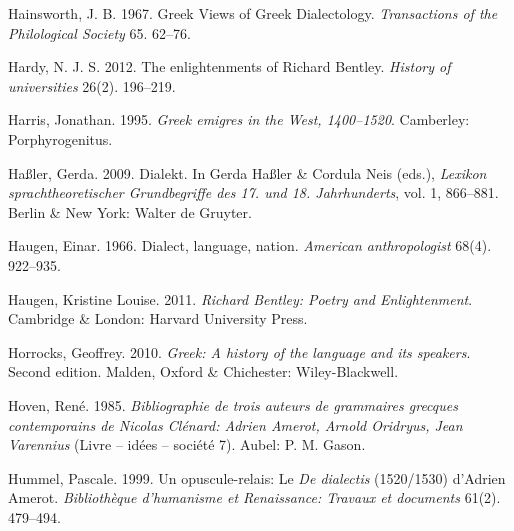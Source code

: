\begin{styleStandard}
Hainsworth, J. B. 1967. Greek Views of Greek Dialectology. \textit{Transactions of the Philological Society} 65. 62–76.
\end{styleStandard}

\begin{styleStandard}
Hardy, N. J. S. 2012. The enlightenments of Richard Bentley. \textit{History of universities} 26(2). 196–219.
\end{styleStandard}

\begin{styleStandard}
Harris, Jonathan. 1995. \textit{Greek emigres in the West, 1400–1520}. Camberley: Porphyrogenitus.
\end{styleStandard}

\begin{styleStandard}
Haßler, Gerda. 2009. Dialekt. In Gerda Haßler \& Cordula Neis (eds.), \textit{Lexikon sprachtheoretischer Grundbegriffe des 17. und 18. Jahrhunderts}, vol. 1, 866–881. Berlin \& New York: Walter de Gruyter.
\end{styleStandard}

\begin{styleStandard}
Haugen, Einar. 1966. Dialect, language, nation. \textit{American anthropologist} 68(4). 922–935.
\end{styleStandard}

\begin{styleStandard}
Haugen, Kristine Louise. 2011. \textit{Richard Bentley: Poetry and Enlightenment}. Cambridge \& London: Harvard University Press.
\end{styleStandard}

\begin{styleStandard}
Horrocks, Geoffrey. 2010. \textit{Greek: A history of the language and its speakers}. Second edition. Malden, Oxford \& Chichester: Wiley-Blackwell.
\end{styleStandard}

\begin{styleStandard}
Hoven, René. 1985. \textit{Bibliographie de trois auteurs de grammaires grecques contemporains de Nicolas Clénard: Adrien Amerot, Arnold Oridryus, Jean Varennius} (Livre – idées – société 7). Aubel: P. M. Gason.
\end{styleStandard}

\begin{styleStandard}
Hummel, Pascale. 1999. Un opuscule-relais: Le \textit{De dialectis} (1520/1530) d’Adrien Amerot. \textit{Bibliothèque d’humanisme et Renaissance: Travaux et documents} 61(2). 479–494.
\end{styleStandard}

